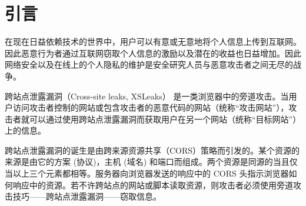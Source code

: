 \section{引言}

在现在日益依赖技术的世界中，用户可以有意或无意地将个人信息上传到互联网。因此恶意行为者通过互联网窃取个人信息的激励以及潜在的收益也日益增加。因此网络安全以及在线上的个人隐私的维护是安全研究人员与恶意攻击者之间无尽的战争。

跨站点泄露漏洞（Cross-site leaks, XSLeaks）\cite{xsleaks} 是一类浏览器中的旁道攻击。当用户访问攻击者控制的网站或包含攻击者的恶意代码的网站（统称“攻击网站”），攻击者就可以通过使用跨站点泄露漏洞而获取用户在另一个网站（统称“目标网站”）上的信息。

跨站点泄露漏洞的诞生是由跨来源资源共享（CORS）策略而引发的。某个资源的来源是由它的方案 (协议)，主机 (域名) 和端口而组成。两个资源是同源的当且仅当以上三个元素都相等。服务器向浏览器发送的响应中的 CORS 头指示浏览器如何响应中的资源。若不许跨站点的网站或脚本读取资源，则攻击者必须使用旁道攻击技巧——跨站点泄露漏洞——窃取信息。

